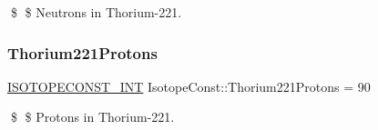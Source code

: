 \$ \$ Neutrons in Thorium-\/221. \mbox{\label{group___isotope_const-_thorium-_th221_gab544c6546d8d74cd81eab7b5e9940d87}} 
\subsubsection{\texorpdfstring{Thorium221\+Protons}{Thorium221Protons}}
{\footnotesize\ttfamily \mbox{\hyperlink{group___isotope_const-_macros_ga5f18360b3e99483a35c32d789e62621c}{I\+S\+O\+T\+O\+P\+E\+C\+O\+N\+S\+T\+\_\+\+I\+NT}} Isotope\+Const\+::\+Thorium221\+Protons = 90}

\$ \$ Protons in Thorium-\/221. 